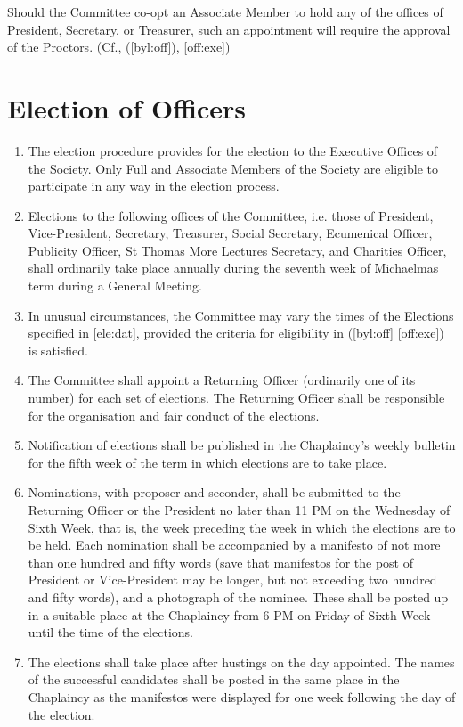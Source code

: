 \documentclass[11pt]{article}
\begin{document}
\begin{enumerate}
Should the Committee co-opt an Associate Member to hold any of the offices of President, Secretary, or Treasurer, such an appointment will require the approval of the Proctors. (Cf.,  (\cref{byl:off}), \cref{off:exe})
\end{enumerate}
\section{Election of Officers}\label{byl:ele}
\begin{enumerate}
\item The election procedure provides for the election to the Executive Offices of the Society. Only Full and Associate Members of the Society are eligible to participate in any way in the election process.
\item \label{ele:dat} Elections to the following offices of the Committee, i.e. those of President, Vice-President, Secretary, Treasurer, Social Secretary, Ecumenical Officer, Publicity Officer, St Thomas More Lectures Secretary, and Charities Officer, shall ordinarily take place annually during the seventh week of Michaelmas term during a General Meeting.
\item \label{ele:unu} In unusual circumstances, the Committee may vary the times of the Elections specified in \cref{ele:dat}, provided the criteria for eligibility in  (\cref{byl:off} \cref{off:exe}) is satisfied.
\item The Committee shall appoint a Returning Officer (ordinarily one of its number) for each set of elections. The Returning Officer shall be responsible for the organisation and fair conduct of the elections.
\item Notification of elections shall be published in the Chaplaincy's weekly bulletin for the fifth week of the term in which elections are to take place.
\item Nominations, with proposer and seconder, shall be submitted to the Returning Officer or the President no later than 11 PM on the Wednesday of Sixth Week, that is, the week preceding the week in which the elections are to be held. Each nomination shall be accompanied by a manifesto of not more than one hundred and fifty words (save that manifestos for the post of President or Vice-President may be longer, but not exceeding two hundred and fifty words), and a photograph of the nominee. These shall be posted up in a suitable place at the Chaplaincy from 6 PM on Friday of Sixth Week until the time of the elections.
\item The elections shall take place after hustings on the day appointed. The names of the successful candidates shall be posted in the same place in the Chaplaincy as the manifestos were displayed for one week following the day of the election.

\end{enumerate}
\end{document}
